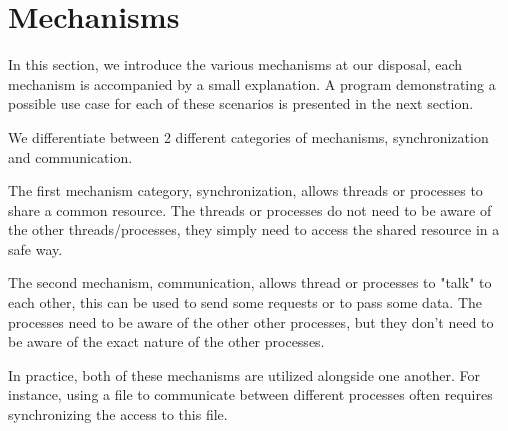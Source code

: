 
\section{Mechanisms}
In this section, we introduce the various mechanisms at our disposal, each mechanism is accompanied by a small explanation. A program demonstrating a possible use case for each of these scenarios is presented in the next section.

We differentiate between 2 different categories of mechanisms, synchronization and communication. 

The first mechanism category, synchronization, allows threads or processes to share a common resource. The threads or processes do not need to be aware of the other threads/processes, they simply need to access the shared resource in a safe way.

The second mechanism, communication, allows thread or processes to "talk" to each other, this can be used to send some requests or to pass some data. The processes need to be aware of the other other processes, but they don't need to be aware of the exact nature of the other processes.

In practice, both of these mechanisms are utilized alongside one another. For instance, using a file to communicate between different processes often requires synchronizing the access to this file.